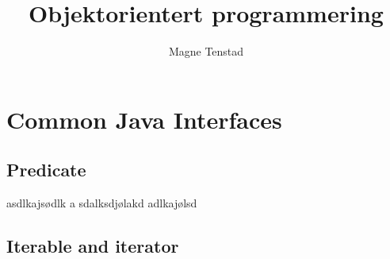 \documentclass{article}
\title{Objektorientert programmering}
\author{Magne Tenstad}
\begin{document}
\maketitle

\clearpage

\tableofcontents

\clearpage

\section{Common Java Interfaces}
\subsection{Predicate}
asdlkajsødlk a
sdalksdjølakd
adlkajølsd

\subsection{Iterable and iterator}
\end{document}
